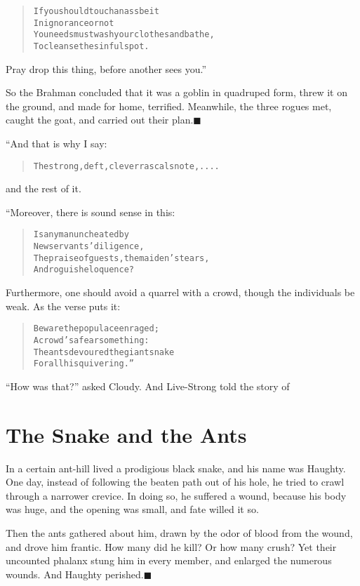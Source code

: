 \documentclass[article, twoside, 14pt]{memoir}
\newcommand{\qed}{\hfill \ensuremath{\blacksquare}}
\renewenvironment{verbatim}{%
\begin{quote}%
\vskip -10pt%
\begin{alltt}\normalfont\large}{\end{alltt}%
\end{quote}%
\vskip -10pt
} %
\begin{document}
\begin{verbatim}
If you should touch an ass{\textemdash}be it
    In ignorance or not{\textemdash}
You needs must wash your clothes and bathe,
    To cleanse the sinful spot.
\end{verbatim}
Pray drop this thing, before another sees you.”

So the Brahman concluded that it was a goblin in quadruped form,
threw it on the ground, and made for home, terrified. Meanwhile,
the three rogues met, caught the goat, and carried out their
plan.\hyperref[s51]{\qed}

“And that is why I say:

\begin{verbatim}
The strong, deft, clever rascals note, ....
\end{verbatim}
and the rest of it.

“Moreover, there is sound sense in this:

\begin{verbatim}
Is any man uncheated by
    New servants’ diligence,
The praise of guests, the maiden’s tears,
    And roguish eloquence?
\end{verbatim}
Furthermore, one should avoid a quarrel with a crowd, though the
individuals be weak. As the verse puts it:

\begin{verbatim}
Beware the populace enraged;
    A crowd's a fearsome thing:
The ants devoured the giant snake
    For all his quivering.”
\end{verbatim}
``How was that?'' asked Cloudy. And Live-Strong told the story of

\chapter{The Snake and the Ants}

\label{s52}

In a certain ant-hill lived a prodigious black snake, and his
name was Haughty. One day, instead of following the beaten path out
of his hole, he tried to crawl through a narrower crevice. In doing
so, he suffered a wound, because his body was huge, and the opening
was small, and fate willed it so.

Then the ants gathered about him, drawn by the odor of blood from
the wound, and drove him frantic. How many did he kill? Or how many
crush? Yet their uncounted phalanx stung him in every member, and
enlarged the numerous wounds. And Haughty
perished.\hyperref[s52]{\qed}
\end{document}
